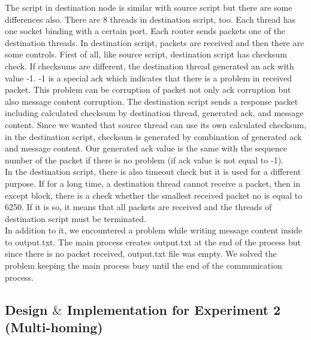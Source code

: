 \documentclass[conference]{IEEEtran}
\begin{document}
The script in destination node is similar with source script but there are some differences also. There are 8 threads in destination script, too. Each thread has one socket binding with a certain port. Each router sends packets one of the destination threads. In destination script, packets are received and then there are some controls. First of all, like source script, destination script has checksum check. If checksums are different, the destination thread generated an ack with value -1. -1 is a special ack which indicates that there is a problem in received packet. This problem can be corruption of packet not only ack corruption but also message content corruption. The destination script sends a response packet including calculated checksum by destination thread, generated ack, and message content. Since we wanted that source thread can use its own calculated checksum, in the destination script, checksum is generated by combination of generated ack and message content. Our generated ack value is the same with the sequence number of the packet if there is no problem (if ack value is not equal to -1). \\

In the destination script, there is also timeout check but it is used for a different purpose. If for a long time, a destination thread cannot receive a packet, then in except block, there is a check whether the smallest received packet no is equal to 6250. If it is so, it means that all packets are received and the threads of destination script must be terminated. \\

In addition to it, we encountered a problem while writing message content inside to output.txt. The main process creates output.txt at the end of the process but since there is no packet received, output.txt file was empty. We solved the problem keeping the main process busy until the end of the communication process.

\subsection{Design $\&$ Implementation for Experiment 2 (Multi-homing)}

\begin{center}
\end{center}
\end{document}
